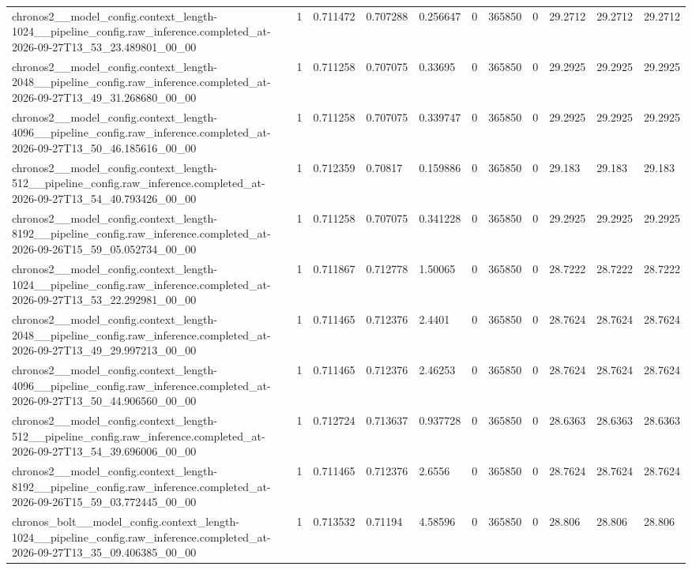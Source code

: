 \begin{tabular}{lllllllllll}
chronos2\_\_model\_config.context\_length-1024\_\_pipeline\_config.raw\_inference.completed\_at-2026-09-27T13\_53\_23.489801\_00\_00 & 1 & 0.711472 & 0.707288 & 0.256647 & 0 & 365850 & 0 & 29.2712 & 29.2712 & 29.2712 \\
chronos2\_\_model\_config.context\_length-2048\_\_pipeline\_config.raw\_inference.completed\_at-2026-09-27T13\_49\_31.268680\_00\_00 & 1 & 0.711258 & 0.707075 & 0.33695 & 0 & 365850 & 0 & 29.2925 & 29.2925 & 29.2925 \\
chronos2\_\_model\_config.context\_length-4096\_\_pipeline\_config.raw\_inference.completed\_at-2026-09-27T13\_50\_46.185616\_00\_00 & 1 & 0.711258 & 0.707075 & 0.339747 & 0 & 365850 & 0 & 29.2925 & 29.2925 & 29.2925 \\
chronos2\_\_model\_config.context\_length-512\_\_pipeline\_config.raw\_inference.completed\_at-2026-09-27T13\_54\_40.793426\_00\_00 & 1 & 0.712359 & 0.70817 & 0.159886 & 0 & 365850 & 0 & 29.183 & 29.183 & 29.183 \\
chronos2\_\_model\_config.context\_length-8192\_\_pipeline\_config.raw\_inference.completed\_at-2026-09-26T15\_59\_05.052734\_00\_00 & 1 & 0.711258 & 0.707075 & 0.341228 & 0 & 365850 & 0 & 29.2925 & 29.2925 & 29.2925 \\
chronos2\_\_model\_config.context\_length-1024\_\_pipeline\_config.raw\_inference.completed\_at-2026-09-27T13\_53\_22.292981\_00\_00 & 1 & 0.711867 & 0.712778 & 1.50065 & 0 & 365850 & 0 & 28.7222 & 28.7222 & 28.7222 \\
chronos2\_\_model\_config.context\_length-2048\_\_pipeline\_config.raw\_inference.completed\_at-2026-09-27T13\_49\_29.997213\_00\_00 & 1 & 0.711465 & 0.712376 & 2.4401 & 0 & 365850 & 0 & 28.7624 & 28.7624 & 28.7624 \\
chronos2\_\_model\_config.context\_length-4096\_\_pipeline\_config.raw\_inference.completed\_at-2026-09-27T13\_50\_44.906560\_00\_00 & 1 & 0.711465 & 0.712376 & 2.46253 & 0 & 365850 & 0 & 28.7624 & 28.7624 & 28.7624 \\
chronos2\_\_model\_config.context\_length-512\_\_pipeline\_config.raw\_inference.completed\_at-2026-09-27T13\_54\_39.696006\_00\_00 & 1 & 0.712724 & 0.713637 & 0.937728 & 0 & 365850 & 0 & 28.6363 & 28.6363 & 28.6363 \\
chronos2\_\_model\_config.context\_length-8192\_\_pipeline\_config.raw\_inference.completed\_at-2026-09-26T15\_59\_03.772445\_00\_00 & 1 & 0.711465 & 0.712376 & 2.6556 & 0 & 365850 & 0 & 28.7624 & 28.7624 & 28.7624 \\
chronos\_bolt\_\_model\_config.context\_length-1024\_\_pipeline\_config.raw\_inference.completed\_at-2026-09-27T13\_35\_09.406385\_00\_00 & 1 & 0.713532 & 0.71194 & 4.58596 & 0 & 365850 & 0 & 28.806 & 28.806 & 28.806 \\

\end{tabular}
